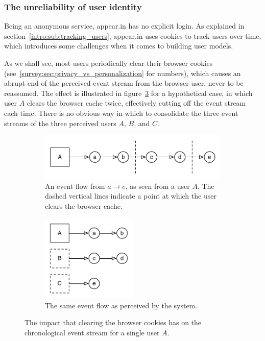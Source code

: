 \subsubsection{The unreliability of user identity}
\label{survey:unreliable_identity}

Being an anonymous service, appear.in has no explicit login. As explained in section~\ref{intro:sub:tracking_users}, appear.in uses cookies to track users over time, which introduces some challenges when it comes to building user models.

As we shall see, most users periodically clear their browser cookies (see~\ref{survey:sec:privacy_vs_personalization} for numbers), which causes an abrupt end of the perceived event stream from the browser user, never to be reassumed. The effect is illustrated in figure~\ref{fig:clear_cookie_impact} for a hypothetical case, in which user $A$ clears the browser cache twice, effectively cutting off the event stream each time. There is no obvious way in which to consolidate the three event streams of the three perceived users $A$, $B$, and $C$.

\begin{figure}[h]
  \centering
    \begin{subfigure}[t]{0.8\textwidth}
      \includegraphics[width=\textwidth]{Figures/event-flow-cache-break-1}
      \caption{An event flow from $a \rightarrow e$, as seen from a user $A$. The dashed vertical lines indicate a point at which the user clears the browser cache.}
      \label{fig:cache_break1}
    \end{subfigure}
    \begin{subfigure}[t]{0.8\textwidth}
      \includegraphics[width=0.5\textwidth]{Figures/event-flow-cache-break-2}
      \caption{The same event flow as perceived by the system.}
      \label{fig:cache_break2}
    \end{subfigure}

    \caption{The impact that clearing the browser cookies has on the chronological event stream for a single user $A$.}
    \label{fig:clear_cookie_impact}
\end{figure}

